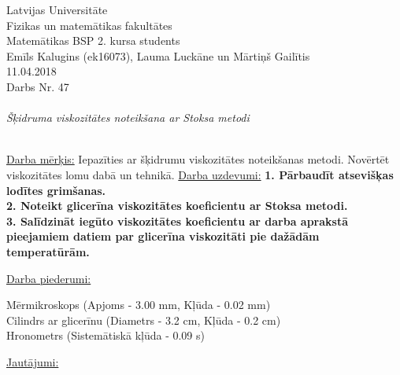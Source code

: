 \documentclass[a4paper,12pt]{article}
\begin{document}
\RaggedLeft
  Latvijas Universitāte \\
  Fizikas un matemātikas fakultātes \\
  Matemātikas BSP 2. kursa students \\ 
  Emīls Kalugins (ek16073), Lauma Luckāne un Mārtiņš Gailītis\\ 
  11.04.2018 \\

\Centering
{\large{Darbs Nr. 47}} \\ ~ \\ 

\textit{\large{Šķidruma viskozitātes noteikšana ar Stoksa metodi}} \\ ~ \\ 

\RaggedRight
{}

\begin{paracol}{2}
  \ul{Darba mērķis:}
  \switchcolumn
  Iepazīties ar šķidrumu viskozitātes noteikšanas metodi. Novērtēt viskozitātes
  lomu dabā un tehnikā.
   \switchcolumn*
  \ul{Darba uzdevumi:}
  \switchcolumn
  \textbf{1. Pārbaudīt atsevišķas lodītes grimšanas.
    \\
    2. Noteikt glicerīna viskozitātes koeficientu ar Stoksa metodi.\\
  3. Salīdzināt iegūto viskozitātes koeficientu ar darba aprakstā pieejamiem
  datiem par glicerīna viskozitāti pie dažādām temperatūrām.\\}

  \switchcolumn*
  \ul{Darba piederumi:}

  \switchcolumn
  Mērmikroskops (Apjoms - 3.00 mm, Kļūda - 0.02 mm)\\
  Cilindrs ar glicerīnu (Diametrs - 3.2 cm, Kļūda - 0.2 cm)\\
  Hronometrs (Sistemātiskā kļūda - 0.09 s)

\end{paracol}

\justify

\noindent
\ul{Jautājumi:}\\
\end{document}
